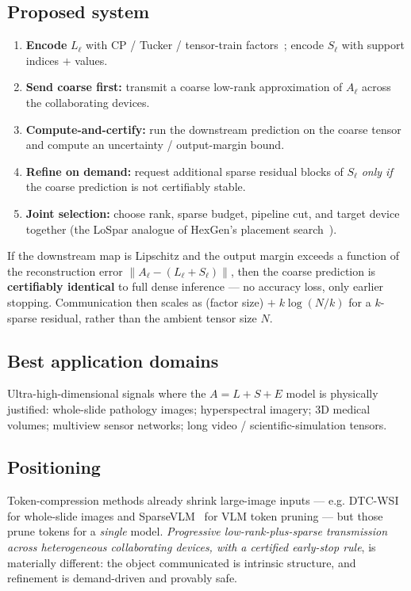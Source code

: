 \documentclass[11pt]{article}
\begin{document}
\subsection*{Proposed system}
\begin{enumerate}[leftmargin=1.5em,itemsep=1pt]
\item \textbf{Encode} $L_\ell$ with CP / Tucker / tensor-train factors~\cite{kolda,tt}; encode $S_\ell$ with support indices $+$ values.
\item \textbf{Send coarse first:} transmit a coarse low-rank approximation of $A_\ell$ across the collaborating devices.
\item \textbf{Compute-and-certify:} run the downstream prediction on the coarse tensor and compute an uncertainty / output-margin bound.
\item \textbf{Refine on demand:} request additional sparse residual blocks of $S_\ell$ \emph{only if} the coarse prediction is not certifiably stable.
\item \textbf{Joint selection:} choose rank, sparse budget, pipeline cut, and target device together (the LoSpar analogue of HexGen's placement search~\cite{hexgen}).
\end{enumerate}

\begin{theorybox}
If the downstream map is Lipschitz and the output margin exceeds a function of the
reconstruction error $\|A_\ell-(L_\ell+S_\ell)\|$, then the coarse prediction is
\textbf{certifiably identical} to full dense inference --- no accuracy loss, only earlier
stopping. Communication then scales as (factor size) $+\;k\log(N/k)$ for a $k$-sparse
residual, rather than the ambient tensor size $N$.
\end{theorybox}

\subsection*{Best application domains}
Ultra-high-dimensional signals where the $A=L+S+E$ model is physically justified:
whole-slide pathology images; hyperspectral imagery; 3D medical volumes; multiview sensor
networks; long video / scientific-simulation tensors.

\subsection*{Positioning}
Token-compression methods already shrink large-image inputs --- e.g. DTC-WSI~\cite{dtcwsi}
for whole-slide images and SparseVLM~\cite{sparsevlm} for VLM token pruning --- but those
prune tokens for a \emph{single} model. \emph{Progressive low-rank-plus-sparse transmission
across heterogeneous collaborating devices, with a certified early-stop rule}, is
materially different: the object communicated is intrinsic structure, and refinement is
demand-driven and provably safe.
\end{document}
